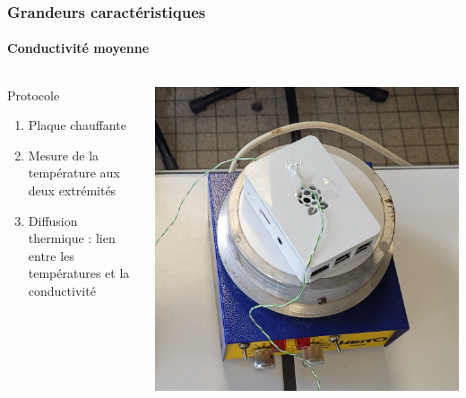 \documentclass[a4paper,11pt]{beamer}
\begin{document}
\begin{frame}
    \frametitle{Grandeurs caractéristiques}
    \framesubtitle{Conductivité moyenne}


    \begin{columns}
        \begin{column}{0.5\textwidth}
            Protocole
            \begin{enumerate}
                \item Plaque chauffante
                \item Mesure de la température aux deux extrémités
                \item Diffusion thermique : lien entre les températures et la conductivité
            \end{enumerate}
        \end{column}
        \begin{column}{0.5\textwidth}
            \includegraphics[width=\textwidth]{agitateur_chauffant.jpg}
        \end{column}
    \end{columns}
\end{frame}
\end{document}
